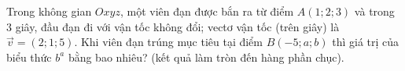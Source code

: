 \begin{bt}%
	Trong không gian $Oxyz$, một viên đạn được bắn ra từ điểm $A(1; 2; 3)$ và trong $3$ giây, đầu đạn đi với vận tốc  không đổi; vectơ vận tốc (trên giây) là $\overrightarrow{v} = (2; 1; 5)$. Khi viên đạn trúng mục tiêu tại điểm $B(-5; a; b)$ thì giá trị của biểu thức $b^a$ bằng bao nhiêu? (kết quả làm tròn đến hàng phần chục).
\end{bt}

